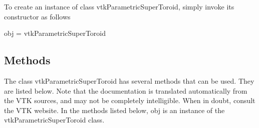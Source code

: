 To create an instance of class vtk\-Parametric\-Super\-Toroid, simply invoke its constructor as follows \begin{DoxyVerb}  obj = vtkParametricSuperToroid
\end{DoxyVerb}
 \hypertarget{vtkwidgets_vtkxyplotwidget_Methods}{}\subsection{Methods}\label{vtkwidgets_vtkxyplotwidget_Methods}
The class vtk\-Parametric\-Super\-Toroid has several methods that can be used. They are listed below. Note that the documentation is translated automatically from the V\-T\-K sources, and may not be completely intelligible. When in doubt, consult the V\-T\-K website. In the methods listed below, {\ttfamily obj} is an instance of the vtk\-Parametric\-Super\-Toroid class. 
